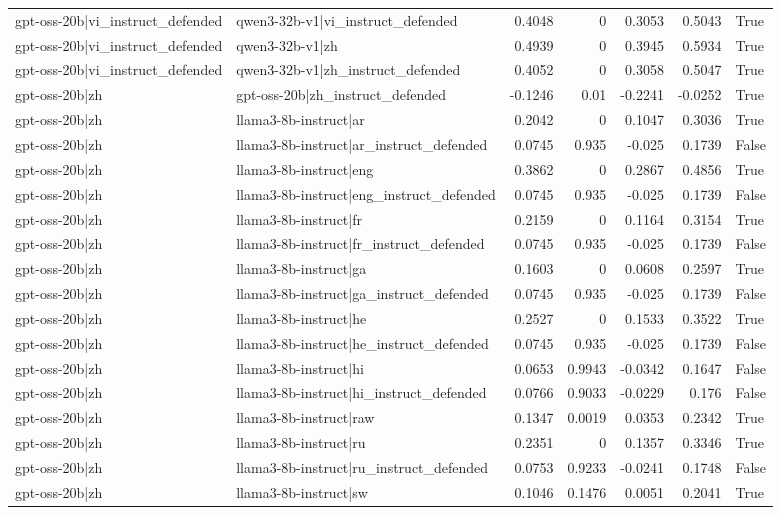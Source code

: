 \begin{table}
\begin{tabular}{l l r r r r l}
gpt-oss-20b|vi_instruct_defended & qwen3-32b-v1|vi_instruct_defended & 0.4048 & 0 & 0.3053 & 0.5043 & True \\
gpt-oss-20b|vi_instruct_defended & qwen3-32b-v1|zh & 0.4939 & 0 & 0.3945 & 0.5934 & True \\
gpt-oss-20b|vi_instruct_defended & qwen3-32b-v1|zh_instruct_defended & 0.4052 & 0 & 0.3058 & 0.5047 & True \\
gpt-oss-20b|zh & gpt-oss-20b|zh_instruct_defended & -0.1246 & 0.01 & -0.2241 & -0.0252 & True \\
gpt-oss-20b|zh & llama3-8b-instruct|ar & 0.2042 & 0 & 0.1047 & 0.3036 & True \\
gpt-oss-20b|zh & llama3-8b-instruct|ar_instruct_defended & 0.0745 & 0.935 & -0.025 & 0.1739 & False \\
gpt-oss-20b|zh & llama3-8b-instruct|eng & 0.3862 & 0 & 0.2867 & 0.4856 & True \\
gpt-oss-20b|zh & llama3-8b-instruct|eng_instruct_defended & 0.0745 & 0.935 & -0.025 & 0.1739 & False \\
gpt-oss-20b|zh & llama3-8b-instruct|fr & 0.2159 & 0 & 0.1164 & 0.3154 & True \\
gpt-oss-20b|zh & llama3-8b-instruct|fr_instruct_defended & 0.0745 & 0.935 & -0.025 & 0.1739 & False \\
gpt-oss-20b|zh & llama3-8b-instruct|ga & 0.1603 & 0 & 0.0608 & 0.2597 & True \\
gpt-oss-20b|zh & llama3-8b-instruct|ga_instruct_defended & 0.0745 & 0.935 & -0.025 & 0.1739 & False \\
gpt-oss-20b|zh & llama3-8b-instruct|he & 0.2527 & 0 & 0.1533 & 0.3522 & True \\
gpt-oss-20b|zh & llama3-8b-instruct|he_instruct_defended & 0.0745 & 0.935 & -0.025 & 0.1739 & False \\
gpt-oss-20b|zh & llama3-8b-instruct|hi & 0.0653 & 0.9943 & -0.0342 & 0.1647 & False \\
gpt-oss-20b|zh & llama3-8b-instruct|hi_instruct_defended & 0.0766 & 0.9033 & -0.0229 & 0.176 & False \\
gpt-oss-20b|zh & llama3-8b-instruct|raw & 0.1347 & 0.0019 & 0.0353 & 0.2342 & True \\
gpt-oss-20b|zh & llama3-8b-instruct|ru & 0.2351 & 0 & 0.1357 & 0.3346 & True \\
gpt-oss-20b|zh & llama3-8b-instruct|ru_instruct_defended & 0.0753 & 0.9233 & -0.0241 & 0.1748 & False \\
gpt-oss-20b|zh & llama3-8b-instruct|sw & 0.1046 & 0.1476 & 0.0051 & 0.2041 & True \\

\end{tabular}
\end{table}
